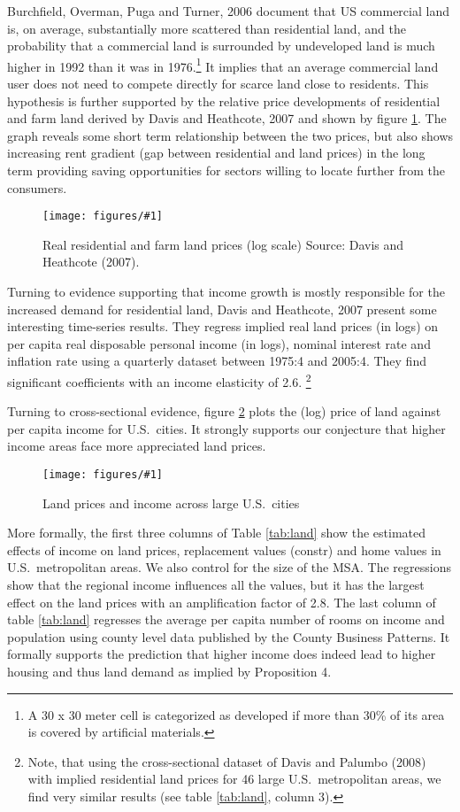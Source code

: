 \documentclass[12pt]{article}
\newcommand{\dofigure}[2]{\begin{figure}
\begin{centering}
\texttt{[image: figures/\#1]}
  \caption{#2\label{fig:#1}}
\end{centering}
\end{figure}}
\begin{document}
Burchfield, Overman, Puga and Turner, 2006 document that US commercial land is, on average, substantially more scattered than residential land, and the probability that a commercial land is surrounded by undeveloped land is much higher in 1992 than it was in 1976.\footnote{A 30 x 30 meter cell is categorized as developed if more than 30\% of its area is covered by artificial materials.} It implies that an average commercial land user does not need to compete directly for scarce land close to residents. This hypothesis is further supported by the relative price developments of residential and farm land derived by Davis and Heathcote, 2007 and shown by figure \ref{fig:dh-prices}. The graph reveals some short term relationship between the two prices, but also shows increasing rent gradient (gap between residential and land prices) in the long term providing saving opportunities for sectors willing to locate further from the consumers.

\dofigure{dh-prices}{Real residential and farm land prices (log scale)\newline
\small Source: Davis and Heathcote (2007).}

Turning to evidence supporting that income growth is mostly responsible for the increased demand for residential land, Davis and Heathcote, 2007 present some interesting time-series results. They regress implied real land prices (in logs) on per capita real disposable personal income (in logs), nominal interest rate and inflation rate using a quarterly dataset between 1975:4 and 2005:4. They find significant coefficients with an income elasticity of 2.6. \footnote{Note, that using the cross-sectional dataset of Davis and Palumbo (2008) with implied residential land prices for 46 large U.S.~metropolitan areas, we find very similar results (see table \ref{tab:land}, column 3).}

Turning to cross-sectional evidence, figure \ref{fig:sc_davis} plots the (log) price of land against per capita income for U.S.~cities. It strongly supports our conjecture that higher income areas face more appreciated land prices.

\dofigure{sc_davis}{Land prices and income across large U.S.~cities}

More formally, the first three columns of Table \ref{tab:land} show the estimated effects of income on land prices,  replacement values (constr) and home values in U.S.~metropolitan areas. We also control for the size of the MSA. The regressions show that the regional income influences all the values, but it has the largest effect on the land prices with an amplification factor of 2.8. The last column of table \ref{tab:land} regresses the average per capita number of rooms on income and population using county level data published by the County Business Patterns. It formally supports the prediction that higher income does indeed lead to higher housing and thus land demand as implied by Proposition 4.
\end{document}
